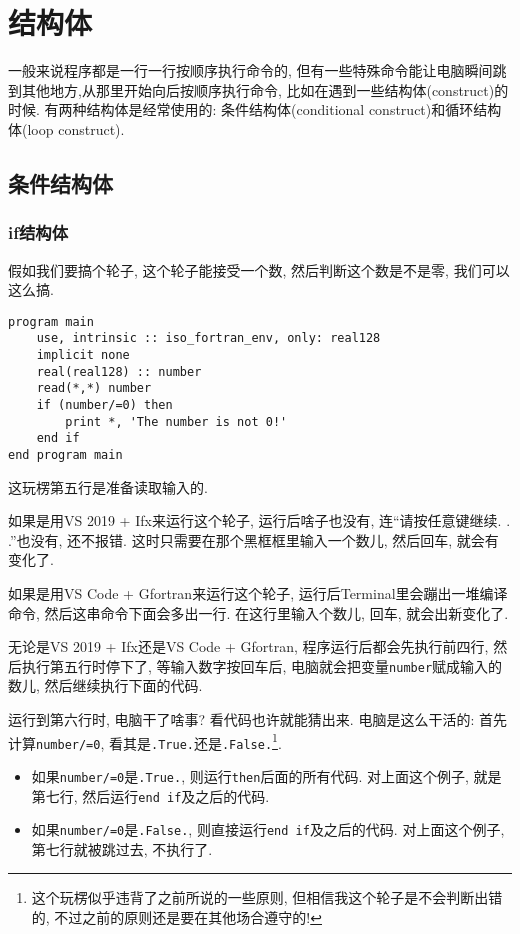 \chapter{结构体}\label{fortran_construct}

一般来说程序都是一行一行按顺序执行命令的, 但有一些特殊命令能让电脑瞬间跳到其他地方,从那里开始向后按顺序执行命令, 比如在遇到一些结构体(construct)的时候. 有两种结构体是经常使用的: 条件结构体(conditional construct)和循环结构体(loop construct).

\section{条件结构体}

\subsection{if结构体}

假如我们要搞个轮子, 这个轮子能接受一个数, 然后判断这个数是不是零, 我们可以这么搞.
\begin{lstlisting}
program main
    use, intrinsic :: iso_fortran_env, only: real128
    implicit none
    real(real128) :: number
    read(*,*) number
    if (number/=0) then
        print *, 'The number is not 0!'
    end if
end program main
\end{lstlisting}

这玩楞第五行是准备读取输入的. 

如果是用VS 2019 + Ifx来运行这个轮子, 运行后啥子也没有, 连``请按任意键继续. . .''也没有, 还不报错. 这时只需要在那个黑框框里输入一个数儿, 然后回车, 就会有变化了.

如果是用VS Code + Gfortran来运行这个轮子, 运行后Terminal里会蹦出一堆编译命令, 然后这串命令下面会多出一行. 在这行里输入个数儿, 回车, 就会出新变化了. 

无论是VS 2019 + Ifx还是VS Code + Gfortran, 程序运行后都会先执行前四行, 然后执行第五行时停下了, 等输入数字按回车后, 电脑就会把变量\texttt{number}赋成输入的数儿, 然后继续执行下面的代码.

运行到第六行时, 电脑干了啥事? 看代码也许就能猜出来. 电脑是这么干活的: 首先计算\texttt{number/=0}, 看其是\texttt{.True.}还是\texttt{.False.}\footnote{
    这个玩楞似乎违背了之前所说的一些原则, 但相信我这个轮子是不会判断出错的, 不过之前的原则还是要在其他场合遵守的!
}.
\begin{itemize}
    \item 如果\texttt{number/=0}是\texttt{.True.}, 则运行\texttt{then}后面的所有代码. 对上面这个例子, 就是第七行, 然后运行\texttt{end if}及之后的代码.
    \item 如果\texttt{number/=0}是\texttt{.False.}, 则直接运行\texttt{end if}及之后的代码. 对上面这个例子, 第七行就被跳过去, 不执行了.
\end{itemize}

